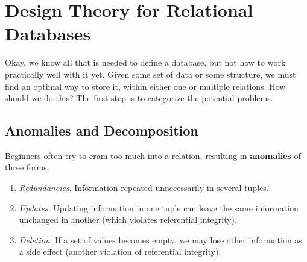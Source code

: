 \documentclass{article}
\begin{document}
\section{Design Theory for Relational Databases}
    
    Okay, we know all that is needed to define a database, but not how to work practically well with it yet. Given some set of data or some structure, we must find an optimal way to store it, within either one or multiple relations. How should we do this? The first step is to categorize the potential problems. 

  \subsection{Anomalies and Decomposition}
    
    \begin{definition}[Anomaly]
      Beginners often try to cram too much into a relation, resulting in \textbf{anomalies} of three forms. 
      \begin{enumerate}
        \item \textit{Redundancies}. Information repeated unnecessarily in several tuples. 
        \item \textit{Updates}. Updating information in one tuple can leave the same information unchanged in another (which violates referential integrity). 
        \item \textit{Deletion}. If a set of values becomes empty, we may lose other information as a side effect (another violation of referential integrity). 
      \end{enumerate}
    \end{definition}
\end{document}
